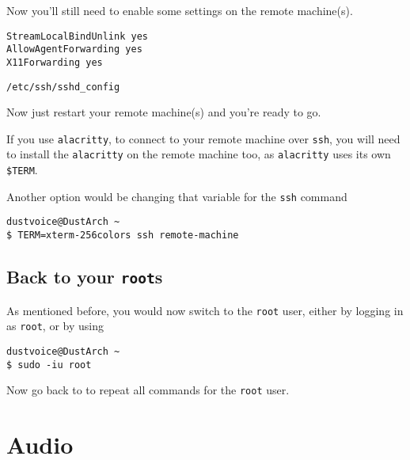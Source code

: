 \documentclass[10pt]{dustdoc}
\begin{document}
Now you’ll still need to enable some settings on the remote machine(s).

\begin{mintedlisting}
    \begin{verbatim}
StreamLocalBindUnlink yes
AllowAgentForwarding yes
X11Forwarding yes
    \end{verbatim}

    \caption{\texttt{/etc/ssh/sshd\_config}}
\end{mintedlisting}

Now just restart your remote machine(s) and you’re ready to go.

\begin{NOTE}
    If you use \texttt{alacritty}, to connect to your remote machine over \texttt{ssh}, you will need to install the \texttt{alacritty} on the remote machine too, as \texttt{alacritty} uses its own \texttt{\$TERM}.

    Another option would be changing that variable for the \texttt{ssh} command

    \begin{verbatim}
dustvoice@DustArch ~
$ TERM=xterm-256colors ssh remote-machine
    \end{verbatim}
\end{NOTE}

\subsection{Back to your \texttt{root}s}
\label{sec:back-to-your-roots}

As mentioned before, you would now switch to the \texttt{root} user, either by logging in as \texttt{root}, or by using

\begin{verbatim}
dustvoice@DustArch ~
$ sudo -iu root
\end{verbatim}

Now go back to  to repeat all commands for the \texttt{root} user.


\section{Audio}
\label{sec:audio}
\end{document}
